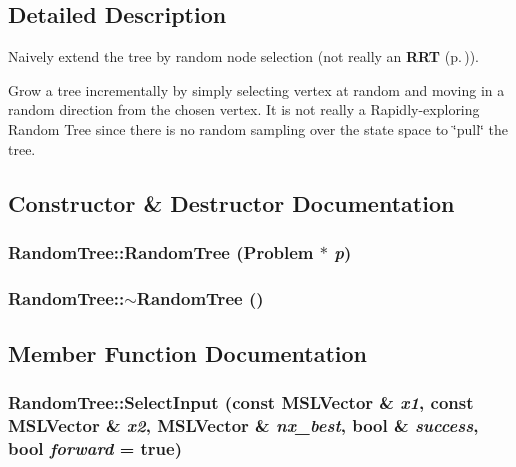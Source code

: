 \subsection{Detailed Description}
Naively extend the tree by random node selection (not really an {\bf RRT} {\rm (p.\,\pageref{classRRT})}).

Grow a tree incrementally by simply selecting vertex at random and  moving in a random direction from the chosen vertex. It is not  really a Rapidly-exploring Random Tree since there is no random sampling over the state space to \char`\"{}pull\char`\"{} the tree. 



\subsection{Constructor \& Destructor Documentation}
\subsubsection{\setlength{\rightskip}{0pt plus 5cm}Random\-Tree::Random\-Tree ({\bf Problem} $\ast$ {\em p})}\label{classRandomTree_a0}


\subsubsection{\setlength{\rightskip}{0pt plus 5cm}Random\-Tree::$\sim$Random\-Tree ()\hspace{0.3cm}{\tt  [inline, virtual]}}\label{classRandomTree_a1}




\subsection{Member Function Documentation}
\subsubsection{ Random\-Tree::Select\-Input (const {\bf MSLVector} \& {\em x1}, const {\bf MSLVector} \& {\em x2}, {\bf MSLVector} \& {\em nx\_\-best}, bool \& {\em success}, bool {\em forward} = true)\hspace{0.3cm}{\tt  [protected, virtual]}}\label{classRandomTree_b1}


